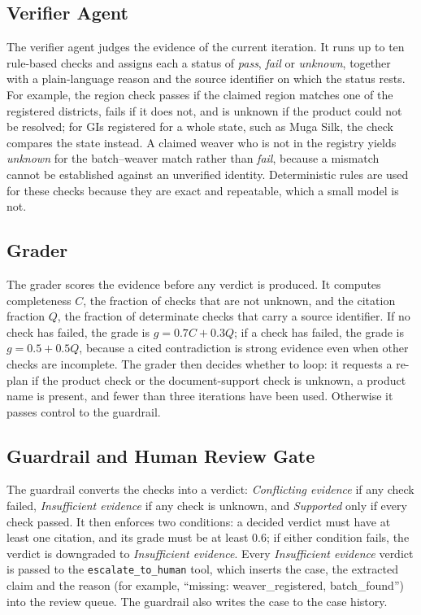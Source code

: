 \subsection{Verifier Agent}

The verifier agent judges the evidence of the current iteration. It runs up to ten rule-based checks
and assigns each a status of \emph{pass}, \emph{fail} or \emph{unknown}, together with a plain-language
reason and the source identifier on which the status rests. For example, the region check passes if
the claimed region matches one of the registered districts, fails if it does not, and is unknown if
the product could not be resolved; for GIs registered for a whole state, such as Muga Silk, the check
compares the state instead. A claimed weaver who is not in the registry yields \emph{unknown} for the
batch--weaver match rather than \emph{fail}, because a mismatch cannot be established against an
unverified identity. Deterministic rules are used for these checks because they are exact and
repeatable, which a small model is not.

\subsection{Grader}

The grader scores the evidence before any verdict is produced. It computes completeness $C$, the
fraction of checks that are not unknown, and the citation fraction $Q$, the fraction of determinate
checks that carry a source identifier. If no check has failed, the grade is $g = 0.7C + 0.3Q$; if a
check has failed, the grade is $g = 0.5 + 0.5Q$, because a cited contradiction is strong evidence even
when other checks are incomplete. The grader then decides whether to loop: it requests a re-plan if the
product check or the document-support check is unknown, a product name is present, and fewer than three
iterations have been used. Otherwise it passes control to the guardrail.

\subsection{Guardrail and Human Review Gate}

The guardrail converts the checks into a verdict: \emph{Conflicting evidence} if any check failed,
\emph{Insufficient evidence} if any check is unknown, and \emph{Supported} only if every check passed.
It then enforces two conditions: a decided verdict must have at least one citation, and its grade must
be at least 0.6; if either condition fails, the verdict is downgraded to \emph{Insufficient evidence}.
Every \emph{Insufficient evidence} verdict is passed to the \texttt{escalate\_to\_human} tool, which
inserts the case, the extracted claim and the reason (for example, ``missing: weaver\_registered,
batch\_found'') into the review queue. The guardrail also writes the case to the case history.

